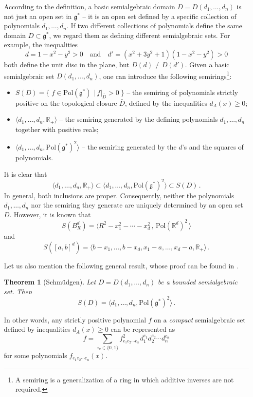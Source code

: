 \documentclass[12pt,a4paper]{article}
\numberwithin{equation}{section}
\theoremstyle{theorem}
\newtheorem{theorem}{Theorem}[]
\theoremstyle{remark}
\newcommand{\gs}{\mathfrak{g}^\ast}
\newcommand{\pol}{\mathrm{Pol}(\mathfrak{g}^\ast )}
\begin{document}
    According to the definition, a basic semialgebraic  domain $D=D(d_1,\ldots,d_n)$ is not just an open set in $\gs$ -- it is an open set defined by a specific collection of polynomials $d_1,\ldots, d_n$. If two different collections of polynomials define the same domain $D\subset \gs$, we regard them as defining different semialgebraic   sets. For example, the inequalities 
    $$
    d=1-x^2-y^2>0\quad \mbox{and}\quad d'=(x^2+3y^2+1)(1-x^2-y^2)>0
    $$
both define the unit disc in the plane, but $D(d)\neq D(d')$.  Given a basic semialgebraic  set $D(d_1,\ldots, d_n)$, one can introduce the following  semirings\footnote{A semiring is a generalization of a ring in which additive inverses are not required.}:
    \begin{itemize}
    \item $S(D)=\{\;f\in \pol\;| \; f|_{\bar D}>0\; \}$ -- the semiring of polynomials strictly positive on the topological closure $\bar D$, defined by the inequalities $d_A(x)\geq 0$; 
        \item $\langle d_1,\ldots, d_n, \mathbb{R}_+ \rangle$ -- the semiring generated by the defining polynomials $d_1,\ldots,d_n$ together with positive reals;  
        \item $\langle d_1,\ldots, d_n, \pol^2 \rangle$ -- the semiring generated by the $d$'s and the squares of polynomials. 
        \end{itemize}
    It is clear that $$\langle d_1,\ldots, d_n, \mathbb{R}_+ \rangle\subset\langle d_1,\ldots, d_n, \pol^2 \rangle\subset S(D)\,.$$
    In general, both inclusions are proper. Consequently,  neither the polynomials $d_1,\ldots,d_n$ nor the semiring they generate are uniquely determined by an open set $D$. However, it is known that 
    $$
    S(B^d_R)=\langle R^2-x_1^2-\cdots-x^2_{d}\,, \,\mathrm{Pol}(\mathbb{R}^d)^2 \, \rangle
    $$
    and
    $$
    S([a,b]^d)=\langle b-x_1,\ldots, b-x_d,x_1-a,\ldots, x_d-a, \mathbb{R}_+\rangle \,.$$
    
Let us also mention the following general result, whose proof can be found in    
\cite{Berr2001PositivePO, book:92008691,scheiderer2024course,book:100944507}.

\begin{theorem}[Schm\"udgen]  \label{T1}
    Let $D=D(d_1,\ldots, d_n)$ be a bounded semialgebraic set. Then $$ S(D)=\langle d_1,\ldots, d_n, \pol^2 \rangle\,.$$ 
\end{theorem}
In other words, any strictly positive polynomial $f$ on a {\it compact} semialgebraic set defined  by inequalities $d_A(x)\geq 0$ can be represented as 
\begin{equation}
 f=\sum_{e_k\in \{0,1\}} f^2_{e_1e_2\cdots e_n}d_1^{e_1}d_2^{e_2}\cdots d_n^{e_n}
\end{equation}
for some polynomials $f_{e_1e_2\cdots e_n}(x)$.
\end{document}
